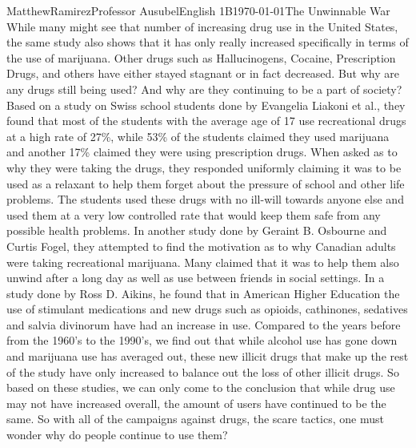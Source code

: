 \documentclass[12pt,letterpaper]{article}
\begin{document}
\begin{mla}{Matthew}{Ramirez}{Professor Ausubel}{English 1B}{\today}{The Unwinnable War}
While many might see that number of increasing drug use in the United States, the same study also shows that it has only really increased specifically in terms of the use of marijuana. Other drugs such as Hallucinogens, Cocaine, Prescription Drugs, and others have either stayed stagnant or in fact decreased. But why are any drugs still being used? And why are they continuing to be a part of society? Based on a study on Swiss school students done by Evangelia Liakoni et al., they found that most of the students with the average age of 17 use recreational drugs at a high rate of 27\%, while 53\% of the students claimed they used marijuana and another 17\% claimed they were using prescription drugs. When asked as to why they were taking the drugs, they responded uniformly claiming it was to be used as a relaxant to help them forget about the pressure of school and other life problems. The students used these drugs with no ill-will towards anyone else and used them at a very low controlled rate that would keep them safe from any possible health problems. In another study done by Geraint B. Osbourne and Curtis Fogel, they attempted to find the motivation as to why Canadian adults were taking recreational marijuana. Many claimed that it was to help them also unwind after a long day as well as use between friends in social settings. In a study done by Ross D. Aikins, he found that in American Higher Education the use of stimulant medications and new drugs such as opioids, cathinones, sedatives and salvia divinorum have had an increase in use. Compared to the years before from the 1960's to the 1990's, we find out that while alcohol use has gone down and marijuana use has averaged out, these new illicit drugs that make up the rest of the study have only increased to balance out the loss of other illicit drugs. So based on these studies, we can only come to the conclusion that while drug use may not have increased overall, the amount of users have continued to be the same. So with all of the campaigns against drugs, the scare tactics, one must wonder why do people continue to use them?\\
\label{The Anti Drug Culture}

\end{mla}
\end{document}
